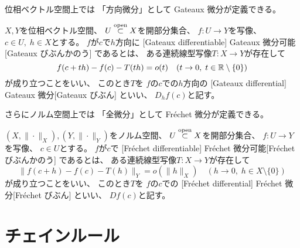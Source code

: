 \documentclass[report]{jlreq}
\begin{document}
位相ベクトル空間上では
「方向微分」として Gateaux 微分が定義できる。

\begin{definition}[Gateaux 微分]
    $X, Y$を位相ベクトル空間、
    $U \stackrel{\text{open}}{\subset} X$を開部分集合、
    $f \colon U \to Y$を写像、
    $c \in U, \; h \in X$とする。
    $f$が$c$で$h$方向に
    [Gateaux differentiable]
        {Gateaux 微分可能}[Gateaux びぶんかのう]
    であるとは、
    ある連続線型写像$T \colon X \to Y$が存在して
    \begin{equation}
        f(c + th) - f(c) - T(th) = o(t)
            \quad (t \to 0, \; t \in \mathbb{R} \setminus \{ 0 \})
    \end{equation}
    が成り立つことをいい、
    このとき$T$を
    $f$の$c$での$h$方向の
    [Gateaux differential]
        {Gateaux 微分}[Gateaux びぶん]
    といい、
    $D_hf(c)$と記す。
\end{definition}

さらにノルム空間上では
「全微分」として Fr\'echet 微分が定義できる。

\begin{definition}[Fr\'echet 微分]
    $(X, \| \cdot \|_X), (Y, \| \cdot \|_Y)$をノルム空間、
    $U \stackrel{\text{open}}{\subset} X$を開部分集合、
    $f \colon U \to Y$を写像、
    $c \in U$とする。
    $f$が$c$で
    [Fr\'echet differentiable]
        {Fr\'echet 微分可能}[Fr\'echet びぶんかのう]
    であるとは、
    ある連続線型写像$T \colon X \to Y$が存在して
    \begin{equation}
        \| f(c + h) - f(c) - T(h) \|_Y = o(\| h \|_X)
            \quad (h \to 0, \; h \in X \setminus \{ 0 \})
    \end{equation}
    が成り立つことをいい、
    このとき$T$を
    $f$の$c$での
    [Fr\'echet differential]
        {Fr\'echet 微分}[Fr\'echet びぶん]
    といい、
    $Df(c)$と記す。
\end{definition}

%
\section{チェインルール}

\TODO{}

%
\end{document}
